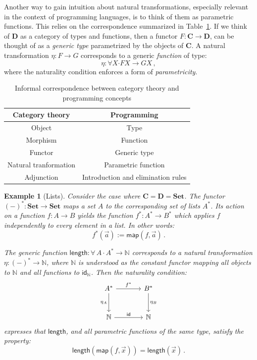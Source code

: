 \documentclass[11pt,oneside,draft]{book}
\newtheorem{example}[theorem]{Example}
\theoremstyle{definition}
\newcommand{\kw}[1]{\ensuremath{ \mathsf{#1} }}
\newcommand{\bdot}{\boldsymbol{\cdot}}
\begin{document}
Another way to gain intuition about natural transformations,
especially relevant in the context of programming languages,
is to think of them as parametric functions.
This relies on the correspondence summarized in Table~\ref{tbl:catpl}.
If we think of $\mathbf{D}$ as a category of types and functions,
then a functor
$F : \mathbf{C} \rightarrow \mathbf{D}$,
can be thought of as a \emph{generic type}
parametrized by the objects of $\mathbf{C}$.
A natural transformation $\eta : F \rightarrow G$
corresponds to a generic \emph{function} of type:
\[
  \eta : \forall X \bdot
    F X \rightarrow G X
  \,,
\]
where the naturality condition
enforces a form of \emph{parametricity}.

\begin{table} %
  \centering
  \begin{tabular}{cc}
    \hline
    Category theory & Programming \\
    \hline
    Object & Type \\
    Morphism & Function \\
    Functor & Generic type \\
    Natural tranformation & Parametric function \\
    Adjunction & Introduction and elimination rules \\
    \hline
  \end{tabular}
  \caption{Informal correspondence between category theory and
    programming concepts}
  \label{tbl:catpl}
\end{table}

\begin{example}[Lists]
Consider the case where
$\mathbf{C} = \mathbf{D} = \mathbf{Set}$.
The functor $(-)^* : \mathbf{Set} \rightarrow \mathbf{Set}$
maps a set $A$ to the corresponding set of lists $A^*$.
Its action on a function  $f : A \rightarrow B$
yields the function $f^* : A^* \rightarrow B^*$
which applies $f$ independently to every element in a list.
In other words:
\[
  f^*(\vec{a}) := \kw{map}(f, \vec{a})
  \,.
\]

The generic function
$
  \kw{length} : \forall \, A \, \bdot \, A^* \rightarrow \mathbb{N}
$
corresponds to a natural transformation
$\eta : (-)^* \rightarrow \mathbb{N}$,
where $\mathbb{N}$ is understood as the constant functor
mapping all objects to $\mathbb{N}$ and all functions to $\kw{id}_\mathbb{N}$.
Then the naturality condition:
\[
  \begin{tikzcd}[sep=large]
    A^* \ar[r, "f^*"] \ar[d, "\eta_A"'] & B^* \ar[d, "\eta_B"] \\
    \mathbb{N} \ar[r, "\kw{id}"] & \mathbb{N}
  \end{tikzcd}
\]
expresses that \kw{length},
and all parametric functions of the same type,
satisfy the property:
\[
  \kw{length}(\kw{map}(f, \vec{x})) = \kw{length}(\vec{x})
  \,.
\]
\end{example}
\end{document}
